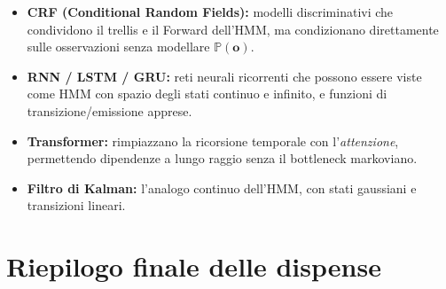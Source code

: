 \documentclass[11pt,a4paper,oneside]{book}
\theoremstyle{plain}
\theoremstyle{definition}
\theoremstyle{remark}
\newcommand{\Prob}{\mathbb{P}}
\newcommand{\seqobs}{\mathbf{o}}             %
\begin{document}
\begin{tcolorbox}[notebox,title=Dall'HMM ai modelli moderni]
\begin{itemize}[leftmargin=*]
    \item \textbf{CRF (Conditional Random Fields):} modelli
          discriminativi che condividono il trellis e il Forward
          dell'HMM, ma condizionano direttamente sulle osservazioni
          senza modellare $\Prob(\seqobs)$.
    \item \textbf{RNN / LSTM / GRU:} reti neurali ricorrenti che
          possono essere viste come HMM con spazio degli stati
          continuo e infinito, e funzioni di transizione/emissione
          apprese.
    \item \textbf{Transformer:} rimpiazzano la ricorsione temporale
          con l'\emph{attenzione}, permettendo dipendenze a lungo
          raggio senza il bottleneck markoviano.
    \item \textbf{Filtro di Kalman:} l'analogo continuo dell'HMM,
          con stati gaussiani e transizioni lineari.
\end{itemize}
\end{tcolorbox}

\section{Riepilogo finale delle dispense}
\end{document}
